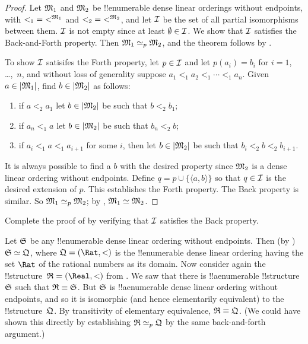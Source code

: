 \documentclass[../../../include/open-logic-section]{subfiles}
\begin{document}
\begin{proof}
  Let $\Struct{M_1}$ and $\Struct{M_2}$ be !!{enumerable} dense linear
  orderings without endpoints, with ${<_1} = \Assign{<}{M_1}$ and ${<_2} =
  \Assign{<}{M_2}$, and let $\mathcal{I}$ be the set of all partial
  isomorphisms between them. $\mathcal{I}$ is not empty since at least
  $\emptyset \in \mathcal{I}$. We show that $\mathcal{I}$ satisfies the
  Back-and-Forth property.  Then $\Struct{M_1} \iso[p] \Struct{M_2}$,
  and the theorem follows by .

  To show $\mathcal{I}$ satisifes the Forth property, let $p \in
  \mathcal{I}$ and let $p(a_i) = b_i$ for $i = 1$, \dots,~$n$, and
  without loss of generality suppose $a_1 <_1 a_2 <_1 \cdots <_1
  a_n$. Given $a \in \Domain{M_1}$, find $b \in \Domain{M_2}$ as
  follows:
  \begin{enumerate}
  \item if $a <_2 a_1$ let $b \in \Domain{M_2}$ be such that $b <_2
    b_1$;
  \item if $a_n <_1 a$ let $b \in \Domain{M_2}$ be such that $b_n <_2 b$;
 \item if $a_i <_1 a <_1 a_{i+1}$ for some $i$, then let $b \in
   \Domain{M_2}$ be such that $b_i <_2 b <_2 b_{i+1}$.
  \end{enumerate}
  It is always possible to find a $b$ with the desired property since
  $\Struct{M_2}$ is a dense linear ordering without endpoints. Define
  $q = p \cup \{ \langle a, b \rangle \}$ so that $q \in \mathcal{I}$ is
  the desired extension of $p$. This establishes the Forth
  property. The Back property is similar. So $\Struct{M_1} \iso[p]
  \Struct{M_2}$; by , $\Struct{M_1} \iso
  \Struct{M_2}$.
\end{proof}

\begin{prob}
  Complete the proof of  by
  verifying that $\mathcal{I}$ satisfies the Back property.
\end{prob}

\begin{rem}
  Let $\Struct{S}$ be any !!{enumerable} dense linear ordering without
  endpoints. Then (by ) $\Struct{S} \iso
  \Struct{Q}$, where $\Struct{Q} = (\Rat, <)$ is the !!{enumerable}
  dense linear ordering having the set $\Rat$ of the rational numbers
  as its domain. Now consider again the !!{structure}~$\Struct{R} =
  (\Real, <)$ from . We saw that there is
  !!a{enumerable} !!{structure}~$\Struct{S}$ such that $\Struct{R}
  \elemequiv \Struct{S}$. But $\Struct{S}$ is !!a{enumerable} dense
  linear ordering without endpoints, and so it is isomorphic (and
  hence elementarily equivalent) to the !!{structure}~$\Struct{Q}$. By
  transitivity of elementary equivalence, $\Struct{R} \elemequiv
  \Struct{Q}$. (We could have shown this directly by establishing
  $\Struct{R} \iso[p] \Struct{Q}$ by the same back-and-forth
  argument.)
\end{rem}
\end{document}

